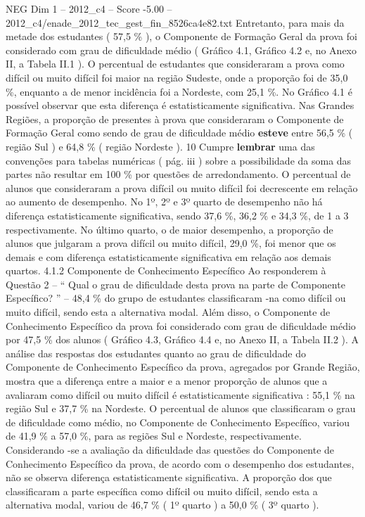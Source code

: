 \begin{textsample}{NEG Dim 1 – 2012\_c4 – Score -5.00 – 2012\_c4/enade\_2012\_tec\_gest\_fin\_8526ca4e82.txt}
Entretanto, para mais da metade dos estudantes ( 57,5 \% ), o Componente de Formação Geral da prova foi considerado com grau de dificuldade médio ( Gráfico 4.1, Gráfico 4.2 e, no Anexo II, a Tabela II.1 ).
O percentual de estudantes que consideraram a prova como difícil ou muito difícil foi maior na região Sudeste, onde a proporção foi de 35,0 \%, enquanto a de menor incidência foi a Nordeste, com 25,1 \%.
No Gráfico 4.1 é possível observar que esta diferença é estatisticamente significativa.
Nas Grandes Regiões, a proporção de presentes à prova que consideraram o Componente de Formação Geral como sendo de grau de dificuldade médio \textbf{esteve} entre 56,5 \% ( região Sul ) e 64,8 \% ( região Nordeste ). 10 Cumpre \textbf{lembrar} uma das convenções para tabelas numéricas ( pág. iii ) sobre a possibilidade da soma das partes não resultar em 100 \% por questões de arredondamento.
O percentual de alunos que consideraram a prova difícil ou muito difícil foi decrescente em relação ao aumento de desempenho.
No 1º, 2º e 3º quarto de desempenho não há diferença estatisticamente significativa, sendo 37,6 \%, 36,2 \% e 34,3 \%, de 1 a 3 respectivamente.
No último quarto, o de maior desempenho, a proporção de alunos que julgaram a prova difícil ou muito difícil, 29,0 \%, foi menor que os demais e com diferença estatisticamente significativa em relação aos demais quartos. 4.1.2 Componente de Conhecimento Específico Ao responderem à Questão 2 – “ Qual o grau de dificuldade desta prova na parte de Componente Específico? ” – 48,4 \% do grupo de estudantes classificaram -na como difícil ou muito difícil, sendo esta a alternativa modal.
Além disso, o Componente de Conhecimento Específico da prova foi considerado com grau de dificuldade médio por 47,5 \% dos alunos ( Gráfico 4.3, Gráfico 4.4 e, no Anexo II, a Tabela II.2 ).
A análise das respostas dos estudantes quanto ao grau de dificuldade do Componente de Conhecimento Específico da prova, agregados por Grande Região, mostra que a diferença entre a maior e a menor proporção de alunos que a avaliaram como difícil ou muito difícil é estatisticamente significativa : 55,1 \% na região Sul e 37,7 \% na Nordeste.
O percentual de alunos que classificaram o grau de dificuldade como médio, no Componente de Conhecimento Específico, variou de 41,9 \% a 57,0 \%, para as regiões Sul e Nordeste, respectivamente.
Considerando -se a avaliação da dificuldade das questões do Componente de Conhecimento Específico da prova, de acordo com o desempenho dos estudantes, não se observa diferença estatisticamente significativa.
A proporção dos que classificaram a parte específica como difícil ou muito difícil, sendo esta a alternativa modal, variou de 46,7 \% ( 1º quarto ) a 50,0 \% ( 3º quarto ).

\end{textsample}
